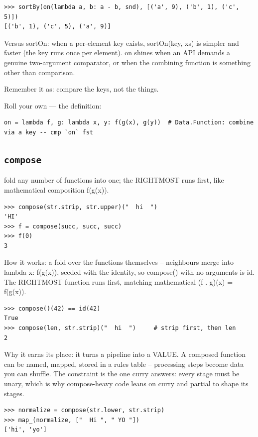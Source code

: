 \documentclass[10pt,letterpaper]{book}
\begin{document}
\begin{lstlisting}[style=ex]
>>> sortBy(on(lambda a, b: a - b, snd), [('a', 9), ('b', 1), ('c', 5)])
[('b', 1), ('c', 5), ('a', 9)]
\end{lstlisting}

Versus sortOn: when a per-element key exists, sortOn(key, xs) is simpler and faster (the key runs once per element). on shines when an API demands a genuine two-argument comparator, or when the combining function is something other than comparison.


Remember it as: compare the keys, not the things.


Roll your own --- the definition:

\begin{lstlisting}[style=ex]
on = lambda f, g: lambda x, y: f(g(x), g(y))  # Data.Function: combine via a key -- cmp `on` fst
\end{lstlisting}
\subsection{\texttt{compose}}\label{def:compose}
fold any number of functions into one; the RIGHTMOST runs first, like mathematical composition f(g(x)).
\begin{lstlisting}[style=ex]
>>> compose(str.strip, str.upper)("  hi  ")
'HI'
>>> f = compose(succ, succ, succ)
>>> f(0)
3
\end{lstlisting}

How it works: a fold over the functions themselves -- neighbours merge into lambda x: f(g(x)), seeded with the identity, so compose() with no arguments is id. The RIGHTMOST function runs first, matching mathematical (f . g)(x) = f(g(x)).

\begin{lstlisting}[style=ex]
>>> compose()(42) == id(42)
True
>>> compose(len, str.strip)("  hi  ")     # strip first, then len
2
\end{lstlisting}

Why it earns its place: it turns a pipeline into a VALUE. A composed function can be named, mapped, stored in a rules table -- processing steps become data you can shuffle. The constraint is the one curry answers: every stage must be unary, which is why compose-heavy code leans on curry and partial to shape its stages.

\begin{lstlisting}[style=ex]
>>> normalize = compose(str.lower, str.strip)
>>> map_(normalize, ["  Hi ", " YO "])
['hi', 'yo']
\end{lstlisting}
\end{document}
